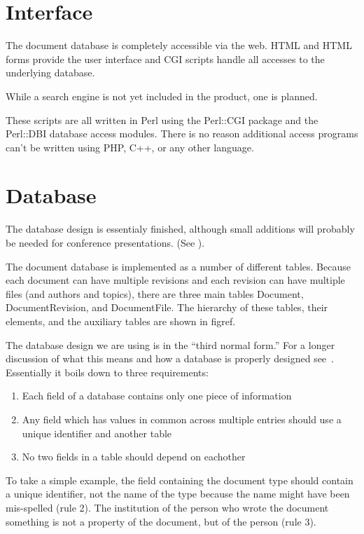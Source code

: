 \documentclass[12pt]{article}
\begin{document}
\section{Interface}

The document database is completely accessible via the web. HTML and HTML forms
provide the user interface and CGI scripts 
handle all accesses to the underlying database. 

While a search engine is not yet included in the product, one is planned.

These scripts are all written in Perl using the Perl::CGI package and 
the Perl::DBI database access modules. There is no reason 
additional access programs can't be written using PHP, C++, or any other 
language. 

\section{Database}

The database design is essentialy finished, although small additions will
probably be needed for conference presentations. (See ).

The document 
database is implemented as a number of different tables. Because each 
document can have multiple revisions and each revision can have 
multiple files (and authors and topics), there are three main tables 
Document, DocumentRevision, and DocumentFile. The hierarchy of these 
tables, their elements, and the auxiliary tables are shown in figref.

The database design we are using is in the ``third normal form.'' For a longer
discussion of what this means and how a database is properly designed
see~\cite{YargerReeseKing:1999}. Essentially it boils down to three requirements:
\begin{enumerate}
\item{Each field of a database contains only one piece of information}
\item{Any field which has values in common across multiple entries should use a
unique identifier and another table}
\item{No two fields in a table should depend on eachother}
\end{enumerate}
To take a simple example, the field containing the document type should contain
a unique identifier, not the name of the type because the name might have been
mis-spelled (rule 2). The institution of the person who wrote the document
something is not a property of the document, but of the person (rule 3).
\end{document}

